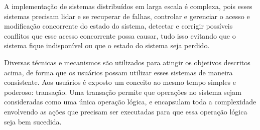\documentclass[11pt,twoside,a4paper]{book}
\begin{document}
A implementação de sistemas distribuídos em larga escala é complexa, pois esses sistemas precisam lidar e se recuperar de falhas, controlar e gerenciar o acesso e modificação concorrente do estado do sistema, detectar e corrigir possíveis conflitos que esse acesso concorrente possa causar, tudo isso evitando que o sistema fique indisponível ou que o estado do sistema seja perdido.

Diversas técnicas e mecanismos são utilizados para atingir os objetivos descritos acima, de forma que os usuários possam utilizar esses sistemas de maneira consistente. Aos usuários é exposto um conceito ao mesmo tempo simples e poderoso: transação. Uma transação permite que operações no sistema sejam consideradas como uma única operação lógica, e encapsulam toda a complexidade envolvendo as ações que precisam ser executadas para que essa operação lógica seja bem sucedida.   



\end{document}

